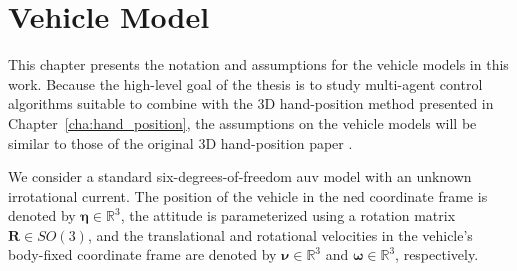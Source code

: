 \chapter{Vehicle Model}\label{cha:vehicle_model}
This chapter presents the notation and assumptions for the vehicle models in this work. Because the high-level goal of the thesis is to study multi-agent control algorithms suitable to combine with the 3D hand-position method presented in Chapter~\ref{cha:hand_position}, the assumptions on the vehicle models will be similar to those of the original 3D hand-position paper \citep{matous_trajectory_2023}.

We consider a standard six-degrees-of-freedom \gls{auv} model with an unknown irrotational current. The position of the vehicle in the \gls{ned} coordinate frame is denoted by $\bm{\eta} \in \mathbb{R}^3$, the attitude is parameterized using a rotation matrix $\mathbf{R}\in SO(3)$, and the translational and rotational velocities in the vehicle's body-fixed coordinate frame are denoted by $\bm{\nu}\in\mathbb{R}^3$ and $\bm{\omega}\in\mathbb{R}^3$, respectively. 

